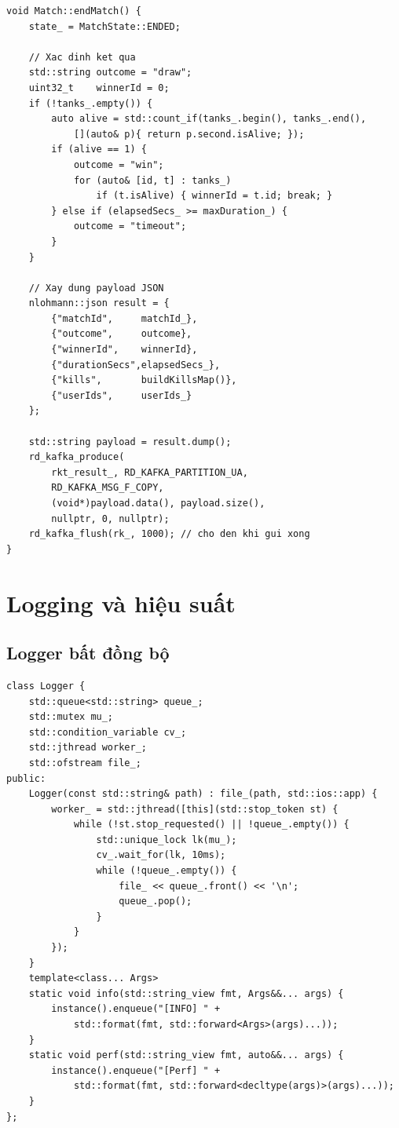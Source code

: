 \documentclass[12pt,a4paper]{report}
\begin{document}
\begin{lstlisting}[style=cppStyle, caption={Kafka Producer: phát match.result khi trận kết thúc}, label={lst:kafkaproducer}]
void Match::endMatch() {
    state_ = MatchState::ENDED;

    // Xac dinh ket qua
    std::string outcome = "draw";
    uint32_t    winnerId = 0;
    if (!tanks_.empty()) {
        auto alive = std::count_if(tanks_.begin(), tanks_.end(),
            [](auto& p){ return p.second.isAlive; });
        if (alive == 1) {
            outcome = "win";
            for (auto& [id, t] : tanks_)
                if (t.isAlive) { winnerId = t.id; break; }
        } else if (elapsedSecs_ >= maxDuration_) {
            outcome = "timeout";
        }
    }

    // Xay dung payload JSON
    nlohmann::json result = {
        {"matchId",     matchId_},
        {"outcome",     outcome},
        {"winnerId",    winnerId},
        {"durationSecs",elapsedSecs_},
        {"kills",       buildKillsMap()},
        {"userIds",     userIds_}
    };

    std::string payload = result.dump();
    rd_kafka_produce(
        rkt_result_, RD_KAFKA_PARTITION_UA,
        RD_KAFKA_MSG_F_COPY,
        (void*)payload.data(), payload.size(),
        nullptr, 0, nullptr);
    rd_kafka_flush(rk_, 1000); // cho den khi gui xong
}
\end{lstlisting}

\section{Logging và hiệu suất}

\subsection{Logger bất đồng bộ}

\begin{lstlisting}[style=cppStyle, caption={Logger async: ghi log ra file không block game thread}, label={lst:logger}]
class Logger {
    std::queue<std::string> queue_;
    std::mutex mu_;
    std::condition_variable cv_;
    std::jthread worker_;
    std::ofstream file_;
public:
    Logger(const std::string& path) : file_(path, std::ios::app) {
        worker_ = std::jthread([this](std::stop_token st) {
            while (!st.stop_requested() || !queue_.empty()) {
                std::unique_lock lk(mu_);
                cv_.wait_for(lk, 10ms);
                while (!queue_.empty()) {
                    file_ << queue_.front() << '\n';
                    queue_.pop();
                }
            }
        });
    }
    template<class... Args>
    static void info(std::string_view fmt, Args&&... args) {
        instance().enqueue("[INFO] " +
            std::format(fmt, std::forward<Args>(args)...));
    }
    static void perf(std::string_view fmt, auto&&... args) {
        instance().enqueue("[Perf] " +
            std::format(fmt, std::forward<decltype(args)>(args)...));
    }
};
\end{lstlisting}
\end{document}
